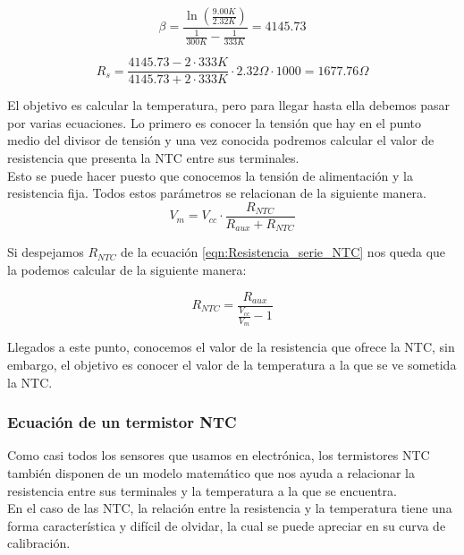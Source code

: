 \documentclass[12pt]{article}
\begin{document}
\begin{equation*}
	\beta = \frac{\ln{\left(\frac{9.00K}{2.32K}\right)}}{\frac{1}{300K} - \frac{1}{333K}} = 4145.73
\end{equation*}

\begin{equation*}
	R_{s} = \frac{4145.73 - 2 \cdot 333K}{4145.73 + 2 \cdot 333K} \cdot 2.32 \Omega \cdot 1000 = 1677.76 \Omega
\end{equation*}

El objetivo es calcular la temperatura, pero para llegar hasta ella debemos pasar por varias ecuaciones. Lo primero es conocer la tensión que hay en el punto medio del divisor de tensión y una vez conocida podremos calcular el valor de resistencia que presenta la NTC entre sus terminales. \\

Esto se puede hacer puesto que conocemos la tensión de alimentación y la resistencia fija. Todos estos parámetros se relacionan de la siguiente manera. \\

\begin{equation}
	\label{eqn:Resistencia_serie_NTC}
	V_{m} = V_{cc} \cdot \frac{R_{NTC}}{R_{aux} + R_{NTC}}
\end{equation}

Si despejamos $R_{NTC}$ de la ecuación \eqref{eqn:Resistencia_serie_NTC} nos queda  que la podemos calcular de la siguiente manera:

\begin{equation}
	\label{eqn:Resistencia_serie_NTC_despejada}
	R_{NTC} = \frac{R_{aux}}{\frac{V_{cc}}{V_{m}} - 1}
\end{equation}

Llegados a este punto, conocemos el valor de la resistencia que ofrece la NTC, sin embargo, el objetivo es conocer el valor de la temperatura a la que se ve sometida la NTC. 

\subsubsection{Ecuación de un termistor NTC}

Como casi todos los sensores que usamos en electrónica, los termistores NTC también disponen de un modelo matemático que nos ayuda a relacionar la resistencia entre sus terminales y la temperatura a la que se encuentra. \\

En el caso de las NTC, la relación entre la resistencia y la temperatura tiene una forma característica y difícil de olvidar, la cual se puede apreciar en su curva de calibración.
\end{document}
